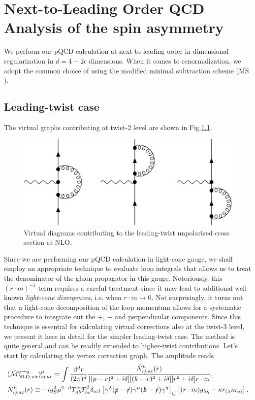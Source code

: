 \chapter{Next-to-Leading Order QCD Analysis of the spin asymmetry}%

We perform our pQCD calculation at next-to-leading order in dimensional regularization in $d=4-2\epsilon$ dimensions. When it comes to renormalization, we adopt the common choice of using the modified minimal subtraction scheme ($\overline{\text{MS}}$).

\section{Leading-twist case}

The virtual graphs contributing at twist-2 level are shown in Fig.\ref{fig:Virt NLO tw2}.
\begin{figure}
    \centering
    \includegraphics[width=0.55\linewidth]{fig/VirtNLOTw2.jpg}
    \caption{Virtual diagrams contributing to the leading-twist unpolarized cross section at NLO.}
    \label{fig:Virt NLO tw2}
\end{figure}
\noindent Since we are performing our pQCD calculation in light-cone gauge, we shall employ an appropriate technique to evaluate loop integrals that allows us to treat the denominator of the gluon propagator in this gauge. Notoriously, this $(r \cdot m)^{-1}$ term requires a careful treatment since it may lead to additional well-known \textit{light-cone divergences}, i.e. when $r \cdot m \to 0$. Not surprisingly, it turns out that a light-cone decomposition of the loop momentum allows for a systematic procedure to integrate out the $+$, $-$ and perpendicular components. Since this technique is essential for calculating virtual corrections also at the twist-3 level, we present it here in detail for the simpler leading-twist case. The method is quite general and can be readily extended to higher-twist contributions. Let's start by calculating the vertex correction graph. The amplitude reads
\begin{equation}\label{eq:amplitudevirtualtwist2}
\begin{aligned}
     &(\hat{\mathcal{M}}^{q \to q}_{\text{NLO,vir}})^\mu_{ij,ac} = \int\frac{\dd ^dr}{(2\pi)^d}\frac{\tilde N^\mu_{ij,ac}(r)}{[(p-r)^2+i\delta][(k-r)^2+i\delta][r^2+i\delta]r \cdot m},\\
       & \tilde N^\mu_{ij,ac}(r) \equiv -ig_S^2\mu^{4-d}T^\alpha_{ab} T^\beta_{bc}\delta_{\alpha\beta}\left[\gamma^\lambda(\slashed{p}-\slashed{r})\gamma^\mu(\slashed{k}-\slashed{r})\gamma^\eta\right]_{ij}\left[(r\cdot m)g_{\lambda\eta}-\kappa r_{(\lambda} m_{\eta)}\right].
    \end{aligned}
\end{equation}
